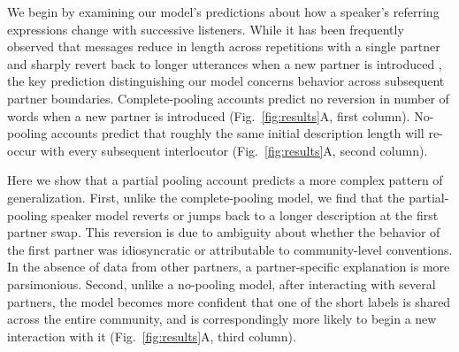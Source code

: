 We begin by examining our model's predictions about how a speaker's referring expressions change with successive listeners.
While it has been frequently observed that messages reduce in length across repetitions with a single partner \cite{krauss_changes_1964} and sharply revert back to longer utterances when a new partner is introduced \cite{wilkes-gibbs_coordinating_1992}, the key prediction distinguishing our model concerns behavior across subsequent partner boundaries.
Complete-pooling accounts predict no reversion in number of words when a new partner is introduced  (Fig.~\ref{fig:results}A, first column).
No-pooling accounts predict that roughly the same initial description length will re-occur with every subsequent interlocutor  (Fig.~\ref{fig:results}A, second column). 

Here we show that a partial pooling account predicts a more complex pattern of generalization.
First, unlike the complete-pooling model, we find that the partial-pooling speaker model reverts or jumps back to a longer description at the first partner swap.
This reversion is due to ambiguity about whether the behavior of the first partner was idiosyncratic or attributable to community-level conventions.
In the absence of data from other partners, a partner-specific explanation is more parsimonious.
Second, unlike a no-pooling model, after interacting with several partners, the model becomes more confident that one of the short labels is shared across the entire community, and is correspondingly more likely to begin a new interaction with it (Fig.~\ref{fig:results}A, third column).

